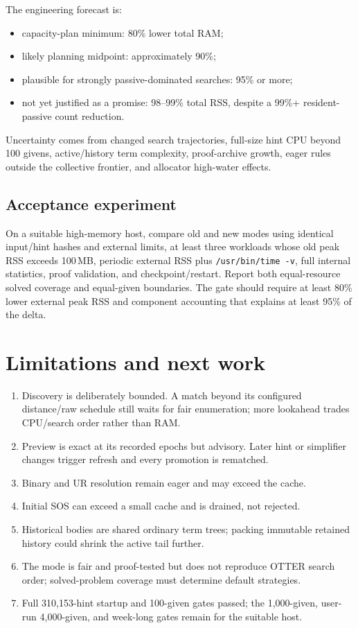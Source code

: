 \documentclass[11pt]{article}
\newcommand{\setting}[1]{\texttt{#1}}
\begin{document}
The engineering forecast is:

\begin{itemize}
  \item capacity-plan minimum: 80\% lower total RAM;
  \item likely planning midpoint: approximately 90\%;
  \item plausible for strongly passive-dominated searches: 95\% or more;
  \item not yet justified as a promise: 98--99\% total RSS, despite a
        99\%+ resident-passive count reduction.
\end{itemize}

Uncertainty comes from changed search trajectories, full-size hint CPU beyond
100 givens, active/history term complexity, proof-archive growth, eager
rules outside the collective frontier, and allocator high-water effects.

\subsection{Acceptance experiment}

On a suitable high-memory host, compare old and new modes using identical
input/hint hashes and external limits, at least three workloads whose old peak
RSS exceeds 100\,MB, periodic external RSS plus \setting{/usr/bin/time -v},
full internal statistics, proof validation, and checkpoint/restart.  Report
both equal-resource solved coverage and equal-given boundaries.  The gate
should require at least 80\% lower external peak RSS and component accounting
that explains at least 95\% of the delta.

\section{Limitations and next work}

\begin{enumerate}
  \item Discovery is deliberately bounded.  A match beyond its configured
        distance/raw schedule still waits for fair enumeration; more
        lookahead trades CPU/search order rather than RAM.
  \item Preview is exact at its recorded epochs but advisory.  Later hint or
        simplifier changes trigger refresh and every promotion is rematched.
  \item Binary and UR resolution remain eager and may exceed the cache.
  \item Initial SOS can exceed a small cache and is drained, not rejected.
  \item Historical bodies are shared ordinary term trees; packing immutable
        retained history could shrink the active tail further.
  \item The mode is fair and proof-tested but does not reproduce OTTER search
        order; solved-problem coverage must determine default strategies.
  \item Full 310,153-hint startup and 100-given gates passed; the 1,000-given,
        user-run 4,000-given, and week-long gates remain for the suitable host.
\end{enumerate}
\end{document}
